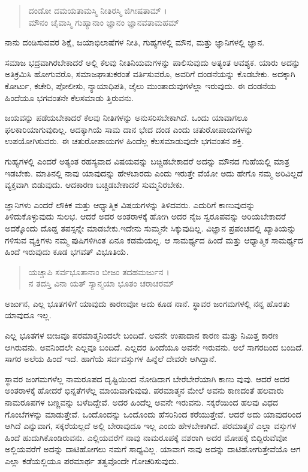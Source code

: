 \begin{verse}
ದಂಡೋ ದಮಯತಾಮಸ್ಮಿ ನೀತಿರಸ್ಮಿ ಜಿಗೀಷತಾಮ್ ।\\ಮೌನಂ ಚೈವಾಸ್ಮಿ ಗುಹ್ಯಾನಾಂ ಜ್ಞಾನಂ ಜ್ಞಾನವತಾಮಹಮ್ 
\end{verse}

{\small ನಾನು ದಂಡಿಸುವವರ ಶಿಕ್ಷೆ, ಜಯಾಭಿಲಾಷೆಗಳ ನೀತಿ, ಗುಹ್ಯಗಳಲ್ಲಿ ಮೌನ, ಮತ್ತು ಜ್ಞಾನಿಗಳಲ್ಲಿ ಜ್ಞಾನ.}

ಸಮಾಜ ಭದ್ರವಾಗಿರಬೇಕಾದರೆ ಅಲ್ಲಿ ಕೆಲವು ನೀತಿನಿಯಮಗಳನ್ನು ಪಾಲಿಸುವುದು ಅತ್ಯಂತ ಆವಶ್ಯಕ. ಯಾರು ಅದನ್ನು ಅತಿಕ್ರಮಿಸಿ ಹೋಗುವರೊ, ಸಮಾಜಘಾತುಕರಂತೆ ವರ್ತಿಸುವರೊ, ಅವರಿಗೆ ದಂಡನೆಯನ್ನು ಕೊಡಬೇಕು. ಅದಕ್ಕಾಗಿ ಕೋರ್ಟು, ಕಚೇರಿ, ಪೋಲೀಸು, ನ್ಯಾಯಾಧಿಪತಿ, ಜೈಲು ಮುಂತಾದುವುಗಳೆಲ್ಲಾ ಇರುವುದು. ಈ ದಂಡನೆಯ ಹಿಂದೆಯೂ ಭಗವಂತನೇ ಕೆಲಸಮಾಡು ತ್ತಿರುವನು.

ಜಯವನ್ನು ಪಡೆಯಬೇಕಾದರೆ ಕೆಲವು ನೀತಿಗಳನ್ನು ಅನುಸರಿಸಬೇಕಾಗಿದೆ. ಒಂದು ಯಾವಾಗಲೂ ಫಲಕಾರಿಯಾಗುವುದಿಲ್ಲ. ಅದಕ್ಕಾಗಿಯೆ ಸಾಮ ದಾನ ಭೇದ ದಂಡ ಎಂದು ಚತುರೋಪಾಯಗಳನ್ನು ಉಪಯೋಗಿಸುವರು. ಈ ಚತುರೋಪಾಯಗಳ ಹಿಂದೆಲ್ಲ ಕೆಲಸಮಾಡುವುದೇ ಭಗವಂತನ ಶಕ್ತಿ.

ಗುಹ್ಯಗಳಲ್ಲಿ ಎಂದರೆ ಅತ್ಯಂತ ರಹಸ್ಯವಾದ ವಿಷಯವನ್ನು ಬಚ್ಚಿಡಬೇಕಾದರೆ ಅದನ್ನು ಮೌನದ ಗುಹೆಯಲ್ಲಿ ಮಾತ್ರ ಇಡಬೇಕು. ಮಾತಿನಲ್ಲಿ ನಾವು ಯಾವುದನ್ನು ಹೇಳಬಾರದು ಎಂದು ಇರುತ್ತೇ ವೆಯೋ ಅದು ಹೇಗೊ ನಮ್ಮ ಅರಿವಿಲ್ಲದೆ ವ್ಯಕ್ತವಾಗಿ ಬಿಡುವುದು. ಆದಕಾರಣ ಬಚ್ಚಿಡಬೇಕಾದರೆ ಸುಮ್ಮನಿರಬೇಕು.

ಜ್ಞಾನಿಗಳು ಎಂದರೆ ಲೌಕಿಕ ಮತ್ತು ಆಧ್ಯಾತ್ಮಿಕ ವಿಷಯಗಳನ್ನು ತಿಳಿದವರು. ಎದುರಿಗೆ ಕಾಣುವುದನ್ನು ತಿಳಿದುಕೊಳ್ಳುವುದು ಸುಲಭ. ಆದರೆ ಅದರ ಅಂತರಾಳಕ್ಕೆ ಹೋಗಿ ಅದರ ನೈಜ ಸ್ವರೂಪವನ್ನು ಅರಿಯಬೇಕಾದರೆ ಅದಕ್ಕೊಂದು ದೊಡ್ಡ ತಪಸ್ಸನ್ನೇ ಮಾಡಬೇಕು.ಇದೇನು ಸುಮ್ಮನೇ ಸಿಕ್ಕುವುದಿಲ್ಲ. ವಿಜ್ಞಾನ ಪ್ರಪಂಚದಲ್ಲಿ ಖ್ಯಾತಿಯನ್ನು ಗಳಿಸುವ ವ್ಯಕ್ತಿಗಳು ನಮ್ಮ ಪುಷಿಗಳಿಗಿಂತ ಏನೂ ಕಡಮೆಯಲ್ಲ. ಆ ಸಾಮರ್ಥ್ಯದ ಹಿಂದೆ ಮತ್ತು ಆಧ್ಯಾತ್ಮಿಕ ಸಾಮರ್ಥ್ಯದ ಹಿಂದೆ ಇರುವುದು ಕೂಡ ಭಗವತ್ ವಿಭೂತಿಯೆ.

\begin{verse}
ಯಚ್ಚಾಪಿ ಸರ್ವಭೂತಾನಾಂ ಬೀಜಂ ತದಹಮರ್ಜುನ ।\\ನ ತದಸ್ತಿ ವಿನಾ ಯತ್ ಸ್ಯಾನ್ಮಯಾ ಭೂತಂ ಚರಾಚರಮ್ 
\end{verse}

{\small ಅರ್ಜುನ, ಎಲ್ಲ ಭೂತಗಳಿಗೆ ಯಾವುದು ಕಾರಣವೋ ಅದು ಕೂಡ ನಾನೆ. ಸ್ಥಾವರ ಜಂಗಮಗಳಲ್ಲಿ ನನ್ನ ಹೊರತು ಯಾವುದೂ ಇಲ್ಲ.}

ಎಲ್ಲ ಭೂತಗಳ ಬೀಜವೂ ಪರಮಾತ್ಮನಿಂದಲೇ ಬಂದಿದೆ. ಅವನೇ ಉಪಾದಾನ ಕಾರಣ ಮತ್ತು ನಿಮಿತ್ತ ಕಾರಣ ಆಗಿರುವನು. ಅವನಿಂದಲೇ ಎಲ್ಲವೂ ಬಂದಿದೆ. ಎಲ್ಲದರ ಹಿಂದೆಯೂ ಅವನೇ ಇರುವನು. ಅಲೆ ಸಾಗರದಿಂದ ಬಂದಿದೆ. ಸಾಗರ ಅಲೆಯ ಹಿಂದೆ ಇದೆ. ಹಾಗೆಯೆ ಸರ್ವವಸ್ತುಗಳ ಹಿನ್ನೆಲೆ ದೇವರೇ ಆಗಿದ್ದಾನೆ.

ಸ್ಥಾವರ ಜಂಗಮಗಳೆಲ್ಲ ನಾಮರೂಪದ ದೃಷ್ಟಿಯಿಂದ ನೋಡಿದಾಗ ಬೇರೆಬೇರೆಯಾಗಿ ಕಾಣು ವುವು. ಆದರೆ ಅದರ ಅಂತರಾಳಕ್ಕೆ ಹೋದರೆ ಭಿನ್ನತೆಗಳೆಲ್ಲ ಮಾಯವಾಗುವುವು. ಪರಮಾತ್ಮನ ಮೇಲೆ ಅವನು ಕಾಣದಂತೆ ಹಲವಾರು ನಾಮರೂಪಗಳ ಬಣ್ಣವನ್ನು ಬಳೆದಿದ್ದೇವೆ. ಅದರ ಹಿಂದೆಲ್ಲ ಅವನೇ ಇರುವನು. ಸಕ್ಕರೆಯಿಂದ ಹಲವು ವಿಧದ ಗೊಂಬೆಗಳನ್ನು ಮಾಡುತ್ತೇವೆ. ಒಂದೊಂದನ್ನು ಒಂದೊಂದು ಹೆಸರಿನಿಂದ ಕರೆಯುತ್ತೇವೆ. ಆದರೆ ಅದು ಯಾವುದರಿಂದ ಆಗಿದೆ ಎನ್ನುವಾಗ, ಸಕ್ಕರೆಯಲ್ಲದೆ ಅಲ್ಲಿ ಬೇರಾವುದೂ ಇಲ್ಲ ಎಂದು ಹೇಳಬೇಕಾಗಿದೆ. ಪರಮಾತ್ಮನೆ ಎಲ್ಲಾ ವಸ್ತುಗಳ ಹಿಂದೆ ಹುದುಗಿಕೊಂಡಿರುವನು. ಎಲ್ಲಿಯವರೆಗೆ ನಾವು ನಾಮರೂಪಕ್ಕೆ ವಶರಾಗಿ ಅದರ ಮೋಹಕ್ಕೆ ಬಿದ್ದಿರುವೆವೋ ಅಲ್ಲಿಯವರೆಗೆ ಅದನ್ನು ದಾಟಿಹೋಗಲು ನಮಗೆ ಸಾಧ್ಯವಿಲ್ಲ. ಯಾವಾಗ ನಾವು ಅದನ್ನು ದಾಟಿಹೋಗುತ್ತೇವೆಯೊ ಆಗ ಎಲ್ಲಾ ಕಡೆಯಲ್ಲಿಯೂ ಪರಮಾರ್ಥ ತತ್ವವೊಂದೇ ಗೋಚರಿಸುವುದು.

